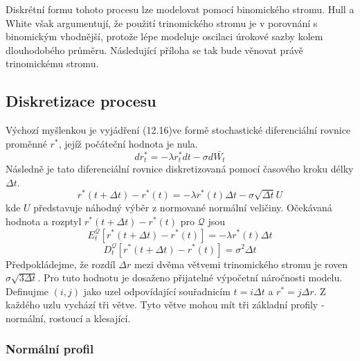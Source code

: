 \documentclass[a4paper]{book}
\begin{document}
Diskrétní formu tohoto procesu lze modelovat pomocí binomického stromu. Hull a White však argumentují, že použití trinomického stromu je v porovnání s binomickým vhodnější, protože lépe modeluje oscilaci úrokové sazby kolem dlouhodobého průměru. Následující příloha se tak bude věnovat právě trinomickému stromu.

\subsection{Diskretizace procesu}

Výchozí myšlenkou je vyjádření (12.16)ve formě stochastické diferenciální rovnice proměnné $r^{*}$, jejíž počáteční hodnota je nula.
\begin{equation}
d r^{*}_t = -\lambda r^{*}_t dt - \sigma d \bar{W_t}
\end{equation}
Následně je tato diferenciální rovnice diskretizovaná pomocí časového kroku délky $\Delta t$.
\begin{equation*}
r^{*}(t + \Delta t) - r^{*}(t) = - \lambda r^{*}(t) \Delta t - \sigma \sqrt{\Delta t}U
\end{equation*}
kde $U$ představuje náhodný výběr z normované normální veličiny. Očekávaná hodnota a rozptyl $r^{*}(t + \Delta t) - r^{*}(t)$ pro $\mathcal{Q}$ jsou
\begin{equation}
E_t^{\mathcal{Q}}[r^{*}(t + \Delta t) - r^{*}(t)] = - \lambda r^*(t) \Delta t
\end{equation}
\begin{equation}
D_t^{\mathcal{Q}}[r^{*}(t + \Delta t) - r^{*}(t)] = \sigma^2 \Delta t
\end{equation}
Předpokládejme, že rozdíl $\Delta r$ mezi dvěma větvemi trinomického stromu je roven $\sigma \sqrt{3 \Delta t}$. Pro tuto hodnotu je dosaženo přijatelné výpočetní náročnosti modelu. Definujme $(i,j)$ jako uzel odpovídající souřadnicím $t = i \Delta t$ a $r^{*} = j \Delta r$. Z každého uzlu vychází tři větve. Tyto větve mohou mít tři základní profily - normální, rostoucí a klesající.

\subsubsection{Normální profil}
\end{document}
